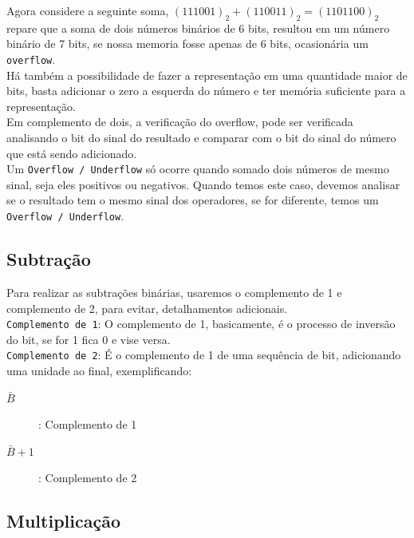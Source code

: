 \documentclass[12pt, onecolumn]{article}
\begin{document}
	Agora considere a seguinte soma, $(111001)_2 + (110011)_2 = (1101100)_2$ 
	repare que a soma de dois números binários de 6 bits, resultou em um número
	binário de 7 bits, se nossa memoria fosse apenas de 6 bits, ocasionária um 
	\texttt{overflow}. \\
	\newline
	Há também a possibilidade de fazer a representação em uma quantidade maior de
	bits, basta adicionar o zero a esquerda do número e ter memória suficiente 
	para a representação. \\
	\newline
	Em complemento de dois, a verificação do overflow, pode ser verificada
	analisando o bit do sinal do resultado e comparar com o bit do sinal
	do número que está sendo adicionado.\\
	\newline
	Um \texttt{Overflow / Underflow} só ocorre quando somado dois números de 
	mesmo sinal, seja eles positivos ou negativos. Quando temos este caso, 
	devemos analisar se o resultado tem o mesmo sinal dos operadores, se for
	diferente, temos um \texttt{Overflow / Underflow}.

	\subsection{\centering Subtração}

	Para realizar as subtrações binárias, usaremos o complemento de 
	1 e complemento	de 2, para evitar, detalhamentos adicionais.\\
	\newline
	\texttt{Complemento de 1}: O complemento de 1, basicamente, é o processo
	de inversão do bit, se for 1 fica 0 e vise versa.\\
	\newline
	\texttt{Complemento de 2}: É o complemento de 1 de uma sequência de bit,
	adicionando uma unidade ao final, exemplificando:
	
	\begin{description}
		\item[$\bar{B}$]: Complemento de 1
		\item[$\bar{B} + 1$]: Complemento de 2
	\end{description}

	\subsection{\centering Multiplicação}
\end{document}

